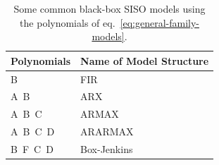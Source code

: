 \begin{table}[h]
  \centering
  \begin{tabular}[h]{ll}
    \toprule
    Polynomials & Name of Model Structure \\
    \midrule
    B & FIR \\
    A\ B & ARX \\
    A\ B\ C & ARMAX \\
    A\ B\ C\ D & ARARMAX \\
    B\ F\ C\ D & Box-Jenkins \\
    \bottomrule
  \end{tabular}
  \caption{Some common black-box SISO models using the polynomials of eq.~\eqref{eq:general-family-models}.}
  \label{tbl:black-box-models}
\end{table}

